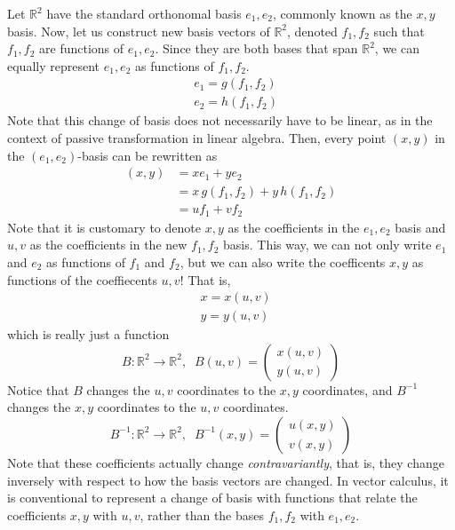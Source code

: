   Let $\mathbb{R}^2$ have the standard orthonomal basis $e_1, e_2$, commonly known as the $x, y$ basis. Now, let us construct new basis vectors of $\mathbb{R}^2$, denoted $f_1, f_2$ such that $f_1, f_2$ are functions of $e_1, e_2$. Since they are both bases that span $\mathbb{R}^2$, we can equally represent $e_1, e_2$ as functions of $f_1, f_2$. 
  \begin{align*}
      &e_1 = g(f_1, f_2)\\
      &e_2 = h(f_1, f_2) 
  \end{align*}
  Note that this change of basis does not necessarily have to be linear, as in the context of passive transformation in linear algebra. Then, every point $(x,y)$ in the $(e_1, e_2)$-basis can be rewritten as
  \begin{align*}
      (x, y) & = x e_1 + y e_2 \\
      & = x \, g(f_1, f_2) + y \, h(f_1, f_2) \\
      & = u f_1 + v f_2
  \end{align*}
  Note that it is customary to denote $x, y$ as the coefficients in the $e_1, e_2$ basis and $u, v$ as the coefficients in the new $f_1, f_2$ basis. This way, we can not only write $e_1$ and $e_2$ as functions of $f_1$ and $f_2$, but we can also write the coefficents $x, y$ as functions of the coeffiecents $u, v$! That is, 
  \begin{align*}
      & x = x(u, v) \\
      & y = y(u, v)
  \end{align*}
  which is really just a function 
  \[B: \mathbb{R}^2 \longrightarrow \mathbb{R}^2, \;\; B(u, v) = \begin{pmatrix} x(u, v) \\ y(u, v) \end{pmatrix}\]
  Notice that $B$ changes the $u, v$ coordinates to the $x, y$ coordinates, and $B^{-1}$ changes the $x, y$ coordinates to the $u, v$ coordinates. 
  \[B^{-1}: \mathbb{R}^2 \longrightarrow \mathbb{R}^2, \;\; B^{-1} (x, y) = \begin{pmatrix} u (x, y) \\ v (x, y) \end{pmatrix}\]
  Note that these coefficients actually change \textit{contravariantly}, that is, they change inversely with respect to how the basis vectors are changed. In vector calculus, it is conventional to represent a change of basis with functions that relate the coefficients $x, y$ with $u, v$, rather than the bases $f_1, f_2$ with $e_1, e_2$. 

